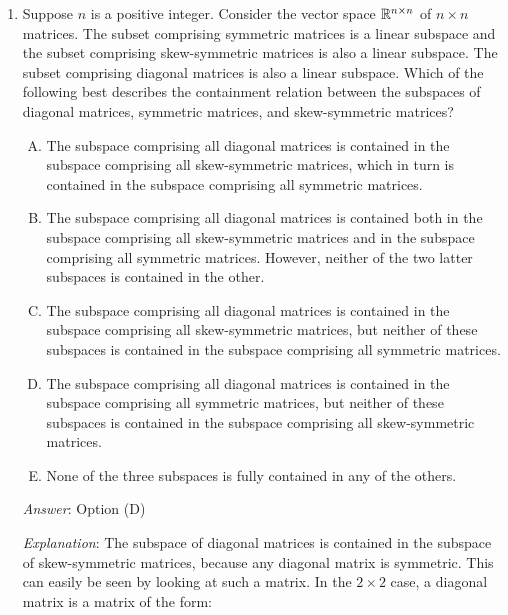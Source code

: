 \documentclass[10pt]{amsart}
\begin{document}
\begin{enumerate}
  {\em Answer}: Option (A)

  {\em Explanation}: For the sum: $(A + A^T)^T = A^T + (A^T)^T = A^T +
  A = A + A^T$. We use that $(A^T)^T = A$ while simplifying.

  For the product: $(AA^T)^T = (A^T)^TA^T$ (we use the rule for
  transpose of a product). This simplifies to $AA^T$ using the fact
  that $(A^T)^T = A$.

  {\em Performance review}: 18 out of 25 got this. 5 chose (B), 2 chose (C).

\item Suppose $n$ is a positive integer. Consider the vector space
  $\mathbb{R}^{n \times n}$ of $n \times n$ matrices. The subset comprising
  symmetric matrices is a linear subspace and the subset comprising
  skew-symmetric matrices is also a linear subspace. The subset
  comprising diagonal matrices is also a linear subspace. Which of the
  following best describes the containment relation between the
  subspaces of diagonal matrices, symmetric matrices, and
  skew-symmetric matrices?

  \begin{enumerate}[(A)]
  \item The subspace comprising all diagonal matrices is contained in
    the subspace comprising all skew-symmetric matrices, which in turn
    is contained in the subspace comprising all symmetric matrices.
  \item The subspace comprising all diagonal matrices is contained
    both in the subspace comprising all skew-symmetric matrices and in
    the subspace comprising all symmetric matrices. However, neither
    of the two latter subspaces is contained in the other.
  \item The subspace comprising all diagonal matrices is contained in
    the subspace comprising all skew-symmetric matrices, but neither
    of these subspaces is contained in the subspace comprising all
    symmetric matrices.
  \item The subspace comprising all diagonal matrices is contained in
    the subspace comprising all symmetric matrices, but neither
    of these subspaces is contained in the subspace comprising all
    skew-symmetric matrices.
  \item None of the three subspaces is fully contained in any of the
    others.
  \end{enumerate}

  {\em Answer}: Option (D)

  {\em Explanation}: The subspace of diagonal matrices is contained in
  the subspace of skew-symmetric matrices, because any diagonal matrix
  is symmetric. This can easily be seen by looking at such a
  matrix. In the $2 \times 2$ case, a diagonal matrix is a matrix of
  the form:


\end{enumerate}
\end{document}
